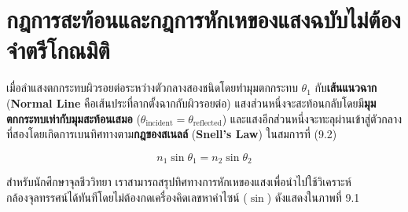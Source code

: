 \section{กฎการสะท้อนและกฎการหักเหของแสงฉบับไม่ต้องจำตรีโกณมิติ}

เมื่อลำแสงตกกระทบผิวรอยต่อระหว่างตัวกลางสองชนิดโดยทำมุมตกกระทบ $\theta_1$ กับ\textbf{เส้นแนวฉาก} (\textbf{Normal Line} คือเส้นประที่ลากตั้งฉากกับผิวรอยต่อ) แสงส่วนหนึ่งจะสะท้อนกลับโดยมี\textbf{มุมตกกระทบเท่ากับมุมสะท้อนเสมอ} ($\theta_{\text{incident}} = \theta_{\text{reflected}}$) และแสงอีกส่วนหนึ่งจะทะลุผ่านเข้าสู่ตัวกลางที่สองโดยเกิดการเบนทิศทางตาม\textbf{กฎของสเนลล์} (\textbf{Snell's Law}) ในสมการที่ (9.2)

\begin{equation}
    n_1 \sin\theta_1 = n_2 \sin\theta_2
\end{equation}

สำหรับนักศึกษาจุลชีววิทยา เราสามารถสรุปทิศทางการหักเหของแสงเพื่อนำไปใช้วิเคราะห์กล้องจุลทรรศน์ได้ทันทีโดยไม่ต้องกดเครื่องคิดเลขหาค่าไซน์ ($\sin$) ดังแสดงใน\mbox{ภาพที่} 9.1

